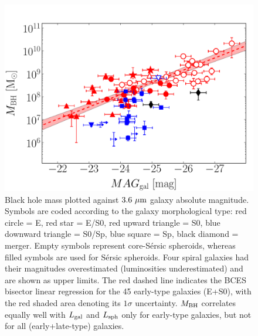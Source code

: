 \documentclass[preprint2]{emulateapj}
\begin{document}
\begin{figure}[h]
\begin{center}
\includegraphics[width=\columnwidth]{mbh_vs_mag_tot.pdf}
\caption{Black hole mass plotted against $3.6\rm~\mu m$ galaxy absolute magnitude. 
Symbols are coded according to the galaxy morphological type: red circle = E, red star = E/S0, 
red upward triangle = S0, blue downward triangle = S0/Sp, blue square = Sp, black diamond = merger. 
Empty symbols represent core-S\'ersic spheroids, whereas filled symbols are used for S\'ersic spheroids. 
Four spiral galaxies had their magnitudes overestimated (luminosities underestimated) and are shown as upper limits. 
The red dashed line indicates the BCES bisector linear regression for the 45 early-type galaxies (E+S0), 
with the red shaded area denoting its $1\sigma$ uncertainty. 
$M_{\rm BH}$ correlates equally well with $L_{\rm gal}$ and $L_{\rm sph}$ only for early-type galaxies, 
but not for all (early+late-type) galaxies. }
\label{fig:mbhmaggal}
\end{center}
\end{figure}
\end{document}
